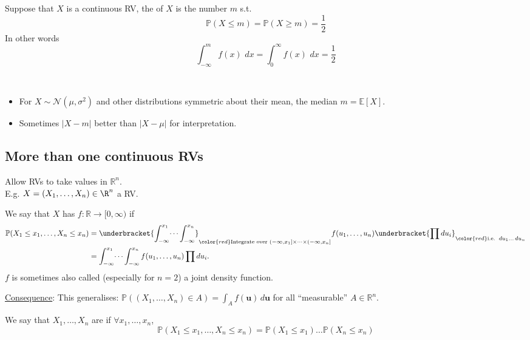 \begin{definition}[Median]
    Suppose that $X$ is a continuous RV, the  of $X$ is the number $m$ s.t.
    \[\mathbb{P}(X\leq m) = \mathbb{P}(X\geq m) = \frac{1}{2}\]
    In other words
    \[\int_{-\infty}^mf(x)\,\,d x = \int_0^{\infty}f(x)\,\,d x = \frac{1}{2}\]
\end{definition}

\begin{remark} ~
    \begin{itemize}
        \item For $X \sim \mathcal{N}(\mu, \sigma^2)$ and other distributions symmetric about their mean, the median $m = \mathbb{E}[X]$.
        \item \color{blue} Sometimes $|X - m|$ better than $|X - \mu|$ for interpretation. \color{black}
    \end{itemize} 
\end{remark} 

\subsection{More than one continuous RVs}
Allow RVs to take values in $\mathbb{R}^n$. \\ 
E.g. $X = (X_1,\dots,X_n) \in \R^n$ a RV. \\

\begin{definition}
    We say that $X$ has  $f : \mathbb{R} \to [0, \infty)$ if
    \begin{align*}
        \mathbb{P}(X_1\leq x_1,\dots,X_n\leq x_n) &= \underbracket{\int_{-\infty}^{x_1}\dots \int_{-\infty}^{x_n}}_{\color{red} \text{Integrate over } (- \infty, x_1] \times \dots \times (-\infty, x_n]} f(u_1,\dots,u_n) \underbracket{\prod du_i}_{\color{red} \text{i.e. } \,du_1 \dots \,du_n} \\
        &= \int_{-\infty}^{x_1}\dots \int_{-\infty}^{x_n} f(u_1,\dots,u_n) \prod du_i.
    \end{align*} 
    $f$ is sometimes also called (especially for $n = 2$) a joint density function.
\end{definition} 

\underline{Consequence}: This generalises: $\mathbb{P}\left( (X_1, \dots, X_n) \in A \right) = \int_A f(\bm{u}) \,d \bm{u}$ for all \color{red} ``measurable'' \color{black} $A \in \mathbb{R}^n$.

\begin{definition}[Independence]
    We say that $X_1,\dots,X_n$ are  if $\forall x_1,\dots,x_n$,
    \[\mathbb{P}(X_1\leq x_1,\dots,X_n\leq x_n) = \mathbb{P}(X_1\leq x_1)\dots \mathbb{P}(X_n\leq x_n)\]
\end{definition}

